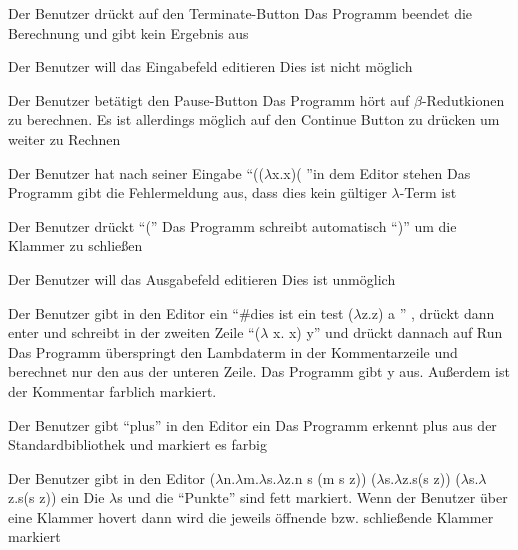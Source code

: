 \documentclass[parskip=full,11pt,twoside]{scrartcl}
\begin{document}
{Der Benutzer drückt auf den Terminate-Button}
{ Das Programm beendet die Berechnung und gibt kein Ergebnis aus }

{Der Benutzer will das Eingabefeld editieren}
{Dies ist nicht möglich}

{Der Benutzer betätigt den Pause-Button}
{Das Programm hört auf $\beta$-Redutkionen zu berechnen. Es ist allerdings möglich auf den Continue Button zu drücken um weiter zu Rechnen}

{ Der Benutzer hat nach seiner Eingabe \enquote{(($\lambda$x.x)( }in dem Editor stehen  }
{ Das Programm gibt die Fehlermeldung aus, dass dies kein gültiger $\lambda$-Term ist }

{Der Benutzer drückt \enquote{(}}
{Das Programm schreibt automatisch \enquote{)} um die Klammer zu schließen}

{Der Benutzer will das Ausgabefeld editieren}
{Dies ist unmöglich}

{Der Benutzer gibt in den Editor ein \enquote{\#dies ist ein test ($\lambda$z.z) a } , drückt dann enter und schreibt in der zweiten Zeile 
\newline \enquote{($\lambda$ x. x) y}  und drückt dannach auf Run}
{Das Programm überspringt den Lambdaterm in der Kommentarzeile und berechnet nur den aus der unteren Zeile. Das Programm gibt y aus.
Außerdem ist der Kommentar farblich markiert. }



{Der Benutzer gibt \enquote{plus} in den Editor ein}
{Das Programm erkennt plus aus der Standardbibliothek und markiert es farbig}

{Der Benutzer gibt in den Editor \newline ($\lambda$n.$\lambda$m.$\lambda$s.$\lambda$z.n s (m s z)) ($\lambda$s.$\lambda$z.s(s z)) ($\lambda$s.$\lambda$z.s(s z)) ein }
{Die $\lambda$s und die \enquote{Punkte} sind fett markiert. Wenn der Benutzer über eine Klammer hovert dann wird die jeweils öffnende bzw. schließende Klammer markiert  }
\end{document}
